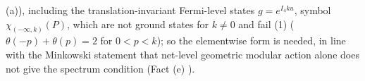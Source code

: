 (a)), including the translation-invariant Fermi-level states $g = e^{I_{4}ku}$, symbol $\chi_{(-\infty, k)}(P)$, which are not ground states for $k \ne 0$ and fail (1) ($\theta(-p) + \theta(p) = 2$ for $0 < p < k$); so the elementwise form is needed, in line with the Minkowski statement that net-level geometric modular action alone does not give the spectrum condition (Fact (e) \cite{BFS1999}).
